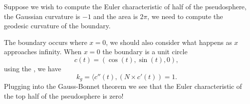 Suppose we wish to compute the Euler characteristic of half of the pseudosphere,
the Gaussian curvature is $-1$ and the area is $2\pi$, we need to compute
the geodesic curvature of the boundary. 

The boundary occurs where $x=0$, we should also consider what happens as $x$ approaches
infinity.  When $x=0$ the boundary is a unit circle 
$$c(t)=(\cos(t),\sin(t),0),$$ using the , we have
$$k_g=\langle c''(t),(N\times c'(t))=1.$$
Plugging into the Gauss-Bonnet theorem we see that
the Euler characteristic of the top half of the pseudosphere is zero!



